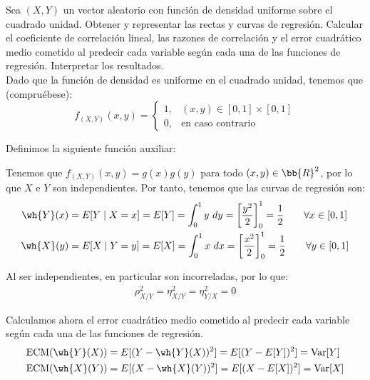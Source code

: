\begin{ejercicio}
    Sea $(X,Y)$ un vector aleatorio con función de densidad uniforme sobre el cuadrado unidad. Obtener y representar las rectas y curvas de regresión. Calcular el coeficiente de correlación lineal, las razones de correlación y el error cuadrático medio cometido al predecir cada variable según cada una de las funciones de regresión. Interpretar los resultados.\\

    Dado que la función de densidad es uniforme en el cuadrado unidad, tenemos que (compruébese):
    \begin{equation*}
        f_{(X,Y)}(x, y) = \begin{cases}
            1, & (x, y) \in [0,1]\times [0,1]\\
            0, & \text{en caso contrario}
        \end{cases}
    \end{equation*}

    Definimos la siguiente función auxiliar:

    Tenemos que $f_{(X,Y)}(x, y) = g(x)g(y)$ para todo $(x, y)\in\bb{R}^2$, por lo que $X$ e $Y$ son independientes. Por tanto, tenemos que las curvas de regresión son:
    \begin{align*}
        \wh{Y}(x) &= E[Y\mid X=x] = E[Y] = \int_{0}^{1} y \ dy = \left[\dfrac{y^2}{2}\right]_{0}^{1} = \dfrac{1}{2} \qquad \forall x\in[0,1]\\
        \wh{X}(y) &= E[X\mid Y=y] = E[X] = \int_{0}^{1} x \ dx = \left[\dfrac{x^2}{2}\right]_{0}^{1} = \dfrac{1}{2} \qquad \forall y\in[0,1]
    \end{align*}

    Al ser independientes, en particular son incorreladas, por lo que:
    \begin{align*}
        \rho^2_{X/Y} = \eta^2_{X/Y} = \eta^2_{Y/X} = 0
    \end{align*}

    Calculamos ahora el error cuadrático medio cometido al predecir cada variable según cada una de las funciones de regresión.
    \begin{align*}
        \text{ECM}(\wh{Y}(X)) &= E[(Y-\wh{Y}(X))^2] = E[(Y-E[Y])^2] = \Var[Y] \\
        \text{ECM}(\wh{X}(Y)) &= E[(X-\wh{X}(Y))^2] = E[(X-E[X])^2] = \Var[X]
    \end{align*}


\end{ejercicio}
